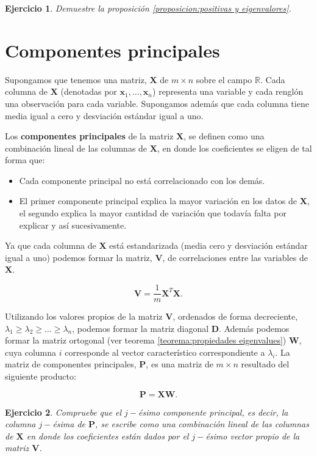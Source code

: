 \documentclass[11pt]{report}
\theoremstyle{break}
\newtheorem{ejercicio}{Ejercicio}[chapter]
\theoremstyle{break}
\newcommand{\mbb}[1]{$\mathbb{#1}$}
\newcommand{\matdim}[2]{$#1 \times #2$}
\begin{document}
\begin{ejercicio}
Demuestre la proposición \ref{proposicion:positivas y eigenvalores}.
\end{ejercicio}

\section{Componentes principales}
\label{seccion:componentes principales}
Supongamos que tenemos una matriz, $\bm{X}$ de \matdim{m}{n} sobre el campo \mbb{R}. Cada columna de $\bm{X}$ (denotadas por $\bm{x}_1, \ldots, \bm{x}_n$) representa una variable y cada renglón una observación para cada variable. Supongamos además que cada columna  tiene media igual a cero y desviación estándar igual a uno.

Los \textbf{componentes principales} de la matriz $\bm{X}$, se definen como una combinación lineal de las columnas de $\bm{X}$, en donde los coeficientes se eligen de tal forma que:

\begin{itemize}
\item Cada componente principal no está correlacionado con los demás.

\item El primer componente principal explica la mayor variación en los datos de $\bm{X}$, el segundo explica la mayor cantidad de variación que todavía falta por explicar y así sucesivamente.
\end{itemize}

Ya que cada columna de $\bm{X}$ está estandarizada (media cero y desviación estándar igual a uno) podemos formar la matriz, $\bm{V}$, de correlaciones entre las variables de $\bm{X}$.

$$ \bm{V} = \dfrac{1}{m} \bm{X}^{T} \bm{X}.$$

Utilizando los valores propios de la matriz $\bm{V}$, ordenados de forma decreciente, $\lambda_1 \geq \lambda_2 \geq \ldots \geq \lambda_n$, podemos formar la matriz diagonal $\bm{D}$. Además podemos formar la matriz ortogonal (ver teorema \ref{teorema:propiedades eigenvalues}) $\bm{W}$, cuya columna $i$ corresponde al vector característico correspondiente a $\lambda_i$. La matriz de componentes principales, $\bm{P}$, es una matriz de \matdim{m}{n} resultado del siguiente producto:

$$ \bm{P} = \bm{XW}.$$

\begin{ejercicio}
Compruebe que el $j-$ésimo componente principal, es decir, la columna $j-$ésima de $\bm{P}$, se escribe como una combinación lineal de las columnas de $\bm{X}$ en donde los coeficientes están dados por el $j-$ésimo vector propio de la matriz $\bm{V}$.
\end{ejercicio}
\end{document}
